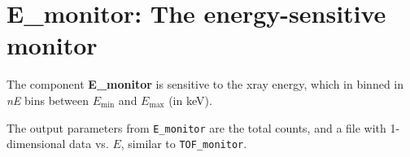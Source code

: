 \section{E\_monitor: The energy-sensitive monitor} \label{s:E_monitor}
The component \textbf{E\_monitor} is sensitive to
the xray energy, which in binned in \textit{nE} bins between
$E_\mathrm{min}$ and $E_\mathrm{max}$ (in keV).

The output parameters from \texttt{E\_monitor} are the total counts,
and a file with 1-dimensional data vs. $E$, similar to \texttt{TOF\_monitor}.
